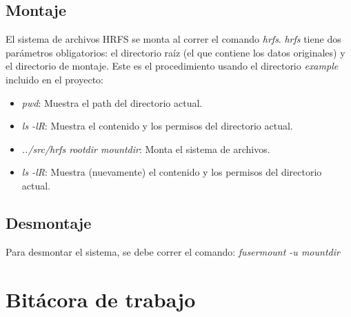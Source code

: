 \documentclass{article}
\begin{document}
\subsection{Montaje}
El sistema de archivos HRFS se monta al correr el comando \emph{hrfs}. \emph{hrfs} tiene dos par\'ametros obligatorios: el directorio ra\'iz (el que contiene los datos originales) y el directorio de montaje. Este es el procedimiento usando el directorio \emph{example} incluido en el proyecto:

\begin{itemize}
  \item \emph{pwd}: Muestra el path del directorio actual.
  \item \emph{ls -lR}: Muestra el contenido y los permisos del directorio actual.
  \item \emph{../src/hrfs rootdir mountdir}: Monta el sistema de archivos.
  \item \emph{ls -lR}: Muestra (nuevamente) el contenido y los permisos del directorio actual.
\end{itemize}

\subsection{Desmontaje}
Para desmontar el sistema, se debe correr el comando: \emph{fusermount -u mountdir}
\section{Bit\'acora de trabajo}
\end{document}
